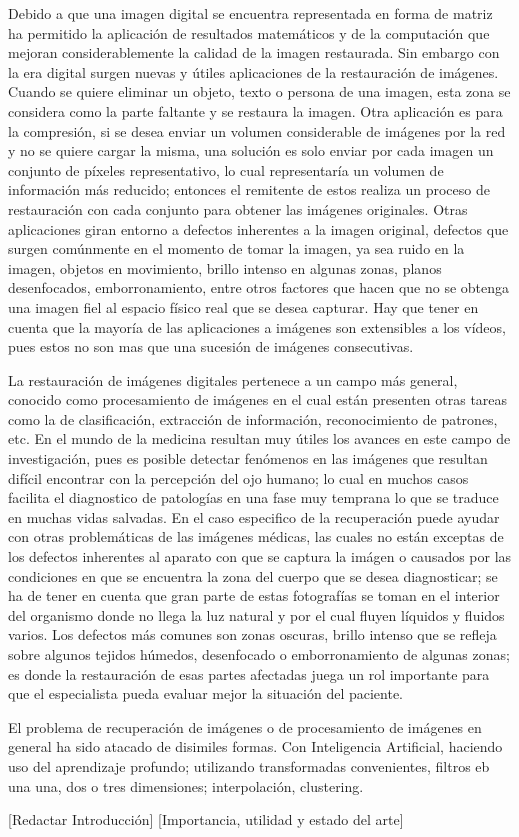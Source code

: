 Debido a que una imagen digital se encuentra representada en forma de matriz ha permitido la aplicaci\'on de resultados matem\'aticos y de la computaci\'on que mejoran considerablemente la calidad de la imagen restaurada. Sin embargo con la era digital surgen nuevas y \'utiles aplicaciones de la restauraci\'on de im\'agenes. Cuando se quiere eliminar un objeto, texto o persona de una imagen, esta zona se considera como la parte faltante y se restaura la imagen. Otra aplicaci\'on es para la compresi\'on, si se desea enviar un volumen considerable de imágenes por la red y no se quiere cargar la misma, una solución es solo enviar por cada imagen un conjunto de p\'ixeles representativo, lo cual representaría un volumen de informaci\'on m\'as reducido; entonces el remitente de estos realiza un proceso de restauraci\'on con cada conjunto para obtener las imágenes originales. Otras aplicaciones giran entorno a defectos inherentes a la imagen original, defectos que surgen comúnmente en el momento de tomar la imagen, ya sea ruido en la imagen, objetos en movimiento, brillo intenso en algunas zonas, planos desenfocados, emborronamiento, entre otros factores que hacen que no se obtenga una imagen fiel al espacio físico real que se desea capturar. Hay que tener en cuenta que la mayor\'ia de las aplicaciones a im\'agenes son extensibles a los vídeos, pues estos no son mas que una sucesión de imágenes consecutivas.

La restauraci\'on de im\'agenes digitales pertenece a un campo m\'as general, conocido como procesamiento de im\'agenes en el cual est\'an presenten otras tareas como la de clasificaci\'on, extracci\'on de informaci\'on, reconocimiento de patrones, etc. En el mundo de la medicina resultan muy \'utiles los avances en este campo de investigaci\'on, pues es posible detectar fen\'omenos en las im\'agenes que resultan difícil encontrar con la percepción del ojo humano; lo cual en muchos casos facilita el diagnostico de patologías en una fase muy temprana lo que se traduce en muchas vidas salvadas. En el caso especifico de la recuperaci\'on puede ayudar con otras problemáticas de las im\'agenes m\'edicas, las cuales no est\'an exceptas de los defectos inherentes al aparato con que se captura la im\'agen o causados por las condiciones en que se encuentra la zona del cuerpo que se desea diagnosticar; se ha de tener en cuenta que gran parte de estas fotograf\'ias se toman en el interior del organismo donde no llega la luz natural y por el cual fluyen l\'iquidos y fluidos varios. Los defectos m\'as comunes son zonas oscuras, brillo intenso que se refleja sobre algunos tejidos h\'umedos, desenfocado o emborronamiento de algunas zonas; es donde la restauraci\'on de esas partes afectadas juega un rol importante para que el especialista pueda evaluar mejor la situaci\'on del paciente.      


\qquad
El problema de recuperaci\'on de im\'agenes o de procesamiento de imágenes en general ha sido atacado de disimiles formas. Con Inteligencia Artificial, haciendo uso del aprendizaje profundo; utilizando transformadas convenientes, filtros eb una una, dos o tres dimensiones; interpolaci\'on, clustering.

[Redactar Introducción]
[Importancia, utilidad y estado del arte]